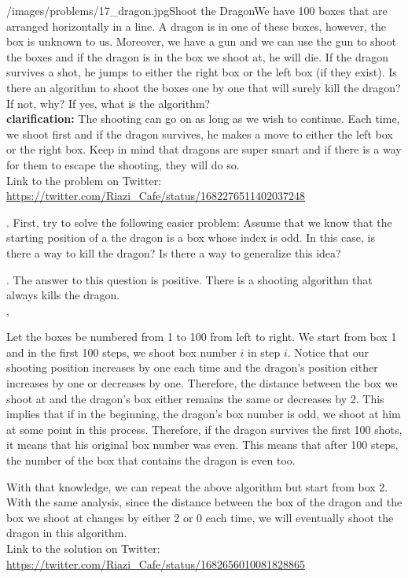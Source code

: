 \begin{problem}{/images/problems/17_dragon.jpg}{Shoot the Dragon}We have 100 boxes that are arranged horizontally in a line. A dragon is in one of these boxes, however, the box is unknown to us. Moreover, we have a gun and we can use the gun to shoot the boxes and if the dragon is in the box we shoot at, he will die. If the dragon survives a shot, he jumps to either the right box or the left box (if they exist). Is there an algorithm to shoot the boxes one by one that will surely kill the dragon? If not, why? If yes, what is the algorithm?\\[0.2cm]

\textbf{clarification:} The shooting can go on as long as we wish to continue. Each time, we shoot first and if the dragon survives, he makes a move to either the left box or the right box. Keep in mind that dragons are super smart and if there is a way for them to escape the shooting, they will do so.\\[0.2cm]

 Link to the problem on Twitter: \url{https://twitter.com/Riazi_Cafe/status/1682276511402037248}\end{problem}
\begin{hint}.
	First, try to solve the following easier problem: Assume that we know that the starting position of a the dragon is a box whose index is odd. In this case, is there a way to kill the dragon? Is there a way to generalize this idea?
\end{hint}
\begin{solution}.
The answer to this question is positive. There is a shooting algorithm that always kills the dragon. \\[0.2cm], 

Let the boxes be numbered from 1 to 100 from left to right. We start from box 1 and in the first 100 steps, we shoot box number $i$ in step $i$. Notice that our shooting position increases by one each time and the dragon's position either increases by one or decreases by one. Therefore, the distance between the box we shoot at and the dragon's box either remains the same or decreases by 2. This implies that if in the beginning, the dragon's box number is odd, we shoot at him at some point in this process. Therefore, if the dragon survives the first 100 shots, it means that his original box number was even. This means that after 100 steps, the number of the box that contains the dragon is even too.

With that knowledge, we can repeat the above algorithm but start from box 2. With the same analysis, since the distance between the box of the dragon and the box we shoot at changes by either 2 or 0 each time, we will eventually shoot the dragon in this algorithm.\\[0.2cm]

Link to the solution on Twitter:  \url{https://twitter.com/Riazi_Cafe/status/1682656010081828865}\end{solution}

